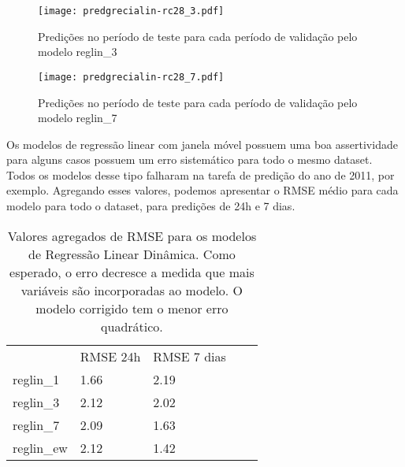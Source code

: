 \begin{figure}[H]
  \centering
  \texttt{[image: predgrecialin-rc28\_3.pdf]}
  \caption{Predições no período de teste para cada período de validação pelo
    modelo reglin\_3}
  \label{fig:rc283preds}

\end{figure}
\begin{figure}[H]
  \centering
  \texttt{[image: predgrecialin-rc28\_7.pdf]}
  \caption{Predições no período de teste para cada período de validação pelo
    modelo reglin\_7}
  \label{fig:rc287preds}

\end{figure}

Os modelos de regressão linear com janela móvel possuem uma boa assertividade
para alguns casos possuem um erro sistemático para todo o mesmo dataset. Todos
os modelos desse tipo falharam na tarefa de predição do ano de 2011, por exemplo.
Agregando esses valores, podemos apresentar o RMSE médio para cada modelo para
todo o dataset, para predições de 24h e 7 dias.

\begin{center}
  \begin{table}[]
    \centering
    \begin{tabular}{l|llll}
      \cline{2-3}
      & \multicolumn{1}{l|}{RMSE 24h} & \multicolumn{1}{l|}{RMSE 7 dias} &  \\ \cline{1-3}
      \multicolumn{1}{|l|}{reglin\_1} & 1.66                          & 2.19                             &  \\ \cline{1-1}
      \multicolumn{1}{|l|}{reglin\_3} & 2.12                          & 2.02                             &  \\ \cline{1-1}
      \multicolumn{1}{|l|}{reglin\_7} & 2.09                          & 1.63                             &  \\ \cline{1-1}
      \multicolumn{1}{|l|}{reglin\_ew} & 2.12                          & 1.42                            &  \\ \cline{1-1}
    \end{tabular}
    \caption{Valores agregados de RMSE para os modelos de Regressão Linear
      Dinâmica. Como esperado, o erro decresce a medida que mais variáveis são
      incorporadas ao modelo. O modelo corrigido tem o menor erro quadrático.}

    \label{tb:rmse_exp}
  \end{table}
\end{center}



